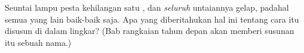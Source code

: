 \begin{exercise}[$\star\star$]\label{exo:g3:first-electric-circuit:11}
Seuntai lampu pesta kehilangan satu , dan \emph{seluruh}
untaiannya gelap, padahal semua  yang lain baik-baik saja. Apa
yang diberitahukan hal ini tentang cara  itu disusun di dalam
lingkar? (Bab rangkaian tahun depan akan memberi susunan itu sebuah
nama.)
\end{exercise}
